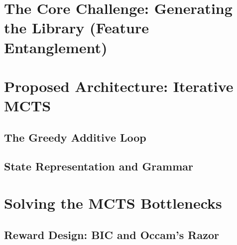 \documentclass[11pt, a4paper]{article}
\begin{document}
\section{The Core Challenge: Generating the Library (Feature Entanglement)}

\section{Proposed Architecture: Iterative MCTS}
\subsection{The Greedy Additive Loop}

\subsection{State Representation and Grammar}

\section{Solving the MCTS Bottlenecks}

\subsection{Reward Design: BIC and Occam's Razor}
\end{document}
